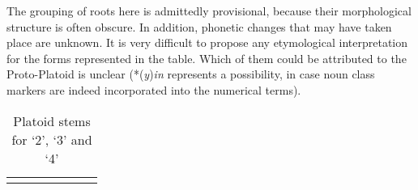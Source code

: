 The grouping of roots here is admittedly provisional, because their morphological structure is often obscure. In addition, phonetic changes that may have taken place are unknown. It is very difficult to propose any etymological interpretation for the forms represented in the table. Which of them could be attributed to the Proto-Platoid is unclear (*(\textit{y})\textit{in} represents a possibility, in case noun class markers are indeed incorporated into the numerical terms).


\begin{table}
\caption{\label{tab:3:43}Platoid stems for `2', `3' and `4'}


\begin{tabularx}{\textwidth}{llQ lQQl}
\lsptoprule


\end{tabularx}
\end{table}
